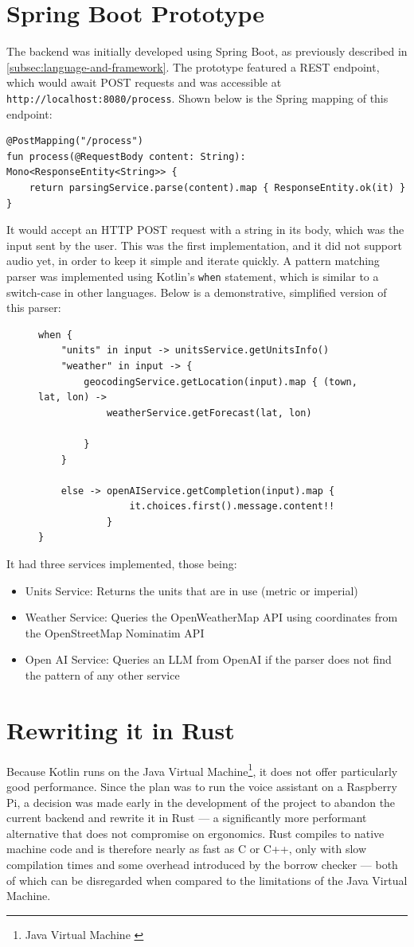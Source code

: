 \section{Spring Boot Prototype}
The backend was initially developed using Spring Boot, as previously described in \ref{subsec:language-and-framework}.
The prototype featured a REST endpoint, which would await POST requests and was accessible at \texttt{http://localhost:8080/process}.
Shown below is the Spring mapping of this endpoint:
\begin{verbatim}
@PostMapping("/process")
fun process(@RequestBody content: String): Mono<ResponseEntity<String>> {
    return parsingService.parse(content).map { ResponseEntity.ok(it) }
}
\end{verbatim}
It would accept an HTTP POST request with a string in its body, which was the input sent by the user.
This was the first implementation, and it did not support audio yet, in order to keep it simple and iterate quickly.
A pattern matching parser was implemented using Kotlin's \texttt{when} statement, which is similar to a switch-case in other languages.
Below is a demonstrative, simplified version of this parser:
\begin{figure}[H]
\begin{verbatim}
when {
    "units" in input -> unitsService.getUnitsInfo()
    "weather" in input -> {
        geocodingService.getLocation(input).map { (town, lat, lon) ->
            weatherService.getForecast(lat, lon)

        }
    }

    else -> openAIService.getCompletion(input).map {
                it.choices.first().message.content!!
            }
}
\end{verbatim}
\end{figure}
It had three services implemented, those being:
\begin{itemize}
  \item Units Service: Returns the units that are in use (metric or imperial)
  \item Weather Service: Queries the OpenWeatherMap API using coordinates from the OpenStreetMap Nominatim API
  \item Open AI Service: Queries an LLM from OpenAI if the parser does not find the pattern of any other service
\end{itemize}

\section{Rewriting it in Rust}
Because Kotlin runs on the Java Virtual Machine\footnote{Java Virtual Machine \cite{jvm}},
it does not offer particularly good performance.
Since the plan was to run the voice assistant on a Raspberry Pi,
a decision was made early in the development of the project
to abandon the current backend and rewrite it in Rust ---
a significantly more performant alternative that does not compromise on ergonomics.
Rust compiles to native machine code and is therefore nearly as fast as C or C++,
only with slow compilation times and some overhead introduced by the borrow checker ---
both of which can be disregarded when compared to the limitations of the Java Virtual Machine.

